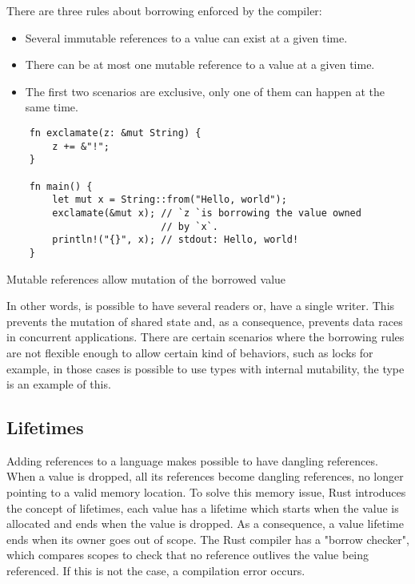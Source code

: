 There are three rules about borrowing enforced by the compiler:
\begin{itemize}
    \item Several immutable references to a value can exist at a given time.
    \item There can be at most one mutable reference to a value at a given time.
    \item The first two scenarios are exclusive, only one of them can happen at the same time.
\end{itemize}

\begin{listing}[h]
	\begin{verbatim}
    fn exclamate(z: &mut String) {
        z += &"!";    
    }

    fn main() {
        let mut x = String::from("Hello, world");
        exclamate(&mut x); // `z `is borrowing the value owned 
                           // by `x`.
        println!("{}", x); // stdout: Hello, world!
    }
	\end{verbatim}
  \caption{Mutable references allow mutation of the borrowed value}
  \label{lst:mutable_ref}
\end{listing}

In other words, is possible to have several readers or, have a single writer.
This prevents the mutation of shared state and, as a consequence, prevents data
races in concurrent applications. There are certain scenarios where the
borrowing rules are not flexible enough to allow certain kind of behaviors,
such as locks for example, in those cases is possible to use types with
internal mutability, the  type is an example of this.

\subsection{Lifetimes}

Adding references to a language makes possible to have dangling references. When
a value is dropped, all its references become dangling references, no longer
pointing to a valid memory location. To solve this memory issue, Rust introduces
the concept of lifetimes, each value has a lifetime which starts when the value
is allocated and ends when the value is dropped. As a consequence, a value
lifetime ends when its owner goes out of scope. The Rust compiler has a "borrow
checker", which compares scopes to check that no reference outlives the value
being referenced. If this is not the case, a compilation error occurs.

